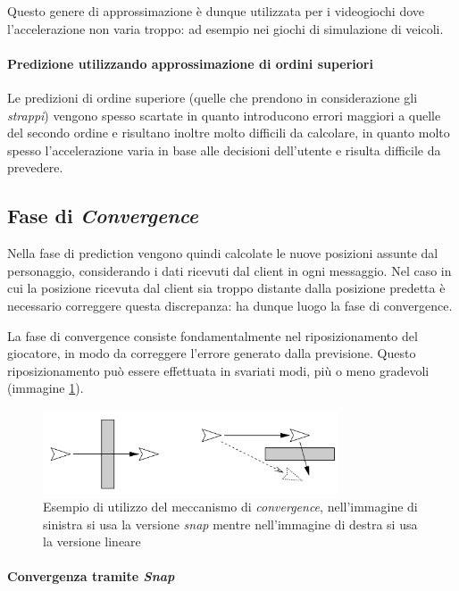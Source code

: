 \documentclass[a4paper,11pt]{article}
\begin{document}
Questo genere di approssimazione \`e dunque utilizzata per i videogiochi dove l'accelerazione non varia troppo: ad esempio nei giochi di simulazione di veicoli.

\paragraph{Predizione utilizzando approssimazione di ordini superiori}

Le predizioni di ordine superiore (quelle che prendono in considerazione gli \emph{strappi}) vengono spesso scartate in quanto introducono errori maggiori a quelle del secondo ordine e risultano inoltre molto difficili da calcolare, in quanto molto spesso l'accelerazione varia in base alle decisioni dell'utente e risulta difficile da prevedere.


\subsection{Fase di \emph{Convergence}}

Nella fase di prediction vengono quindi calcolate le nuove posizioni assunte dal personaggio, considerando i dati ricevuti dal client in ogni messaggio. Nel caso in cui la posizione ricevuta dal client sia troppo distante dalla posizione predetta \`e necessario correggere questa discrepanza: ha dunque luogo la fase di convergence.

La fase di convergence consiste fondamentalmente nel riposizionamento del giocatore, in modo da correggere l'errore generato dalla previsione. Questo riposizionamento pu\`o essere effettuata in svariati modi, pi\`u o meno gradevoli (immagine \ref{img:conv}).

\begin{figure}[ht]
\centering
\includegraphics[height=2.5cm]{conv.png}
\caption{\small{Esempio di utilizzo del meccanismo di \emph{convergence}, nell'immagine di sinistra si usa la versione \emph{snap} mentre nell'immagine di destra si usa la versione lineare}}
\label{img:conv}
\end{figure}


\paragraph{Convergenza tramite \emph{Snap}}
\end{document}
